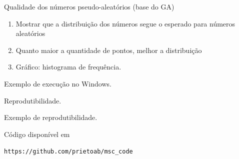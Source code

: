 	Qualidade dos números pseudo-aleatórios (base do GA)
	
	

	\begin{enumerate}
			\item Mostrar que a distribuição dos números segue o esperado para números aleatórios
			\item Quanto maior a quantidade de pontos, melhor a distribuição
			\item Gráfico: histograma de frequência.
	\end{enumerate}

	Exemplo de execução no Windows.

	Reprodutibilidade.
	
	Exemplo de reprodutibilidade.

	Código disponível em

	\texttt{https://github.com/prietoab/msc\_code}
